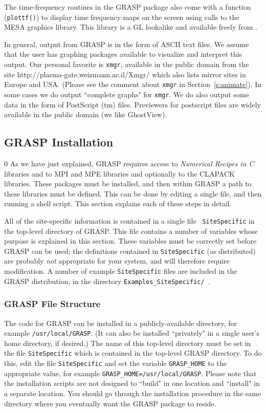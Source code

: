 The time-frequency routines in the GRASP package also come with a function 
({\tt plottf()}) to display time 
frequency-maps on the screen using calls to the MESA graphics library. 
This library is a GL lookalike and available freely
from .

In general, output from GRASP is in the form of ASCII text files.
We assume that the user has graphing packages available to
visualize and interpret this output.   Our personal favorite is
{\tt xmgr}, available in the public domain from the site
{http://plasma-gate.weizmann.ac.il/Xmgr/}
which also lists mirror
sites in Europe and USA. (Please see the comment about {\tt xmgr} in
Section~\ref{s:animate}).  In some cases we do output ``complete graphs"
for {\tt xmgr}.  We do also output some data in the form of PostScript
(tm) files.  Previewers for postscript files are widely available in
the public domain (we like GhostView).

\subsection{GRASP Installation}
\setcounter{equation}0
As we have just explained, GRASP requires access to {\it Numerical
Recipes in C} libraries and to MPI and MPE libraries and optionally
to the CLAPACK libraries. 
These packages must be installed, and then within GRASP a path to
these libraries must be defined.  This can be done by editing a single
file, and then running a shell script.  This section explains each of
these steps in detail.

All of the site-specific information is contained in a single file {\tt
SiteSpecific} in the top-level directory of GRASP.  This file contains
a number of variables whose purpose is explained in this section.
These variables must be correctly set before GRASP can be used; the
definitions contained in  {\tt SiteSpecific} (as distributed) are
probably {\it not} appropriate for your system, and will therefore
require modification.  A number of example {\tt SiteSpecific} files
are included in the GRASP distribution, in the directory {\tt Examples\_SiteSpecific/ }.

\subsubsection{GRASP File Structure}
The code for GRASP can be installed in a publicly-available directory,
for example \mbox{\tt /usr/local/GRASP}.  (It can also be installed
``privately" in a single user's home directory, if desired.)  The name of
this top-level directory must be set in the file {\tt SiteSpecific} which
is contained in the top-level GRASP directory.  To do this, edit the file
{\tt SiteSpecific} and set the variable \mbox{\tt GRASP\_HOME}  to the
appropriate value, for example \mbox{\tt GRASP\_HOME=/usr/local/GRASP}.
Please note that the installation scripts are not designed to ``build"
in one location and ``install" in a separate location.  You should go through
the installation procedure in the same directory where you eventually want
the GRASP package to reside.

